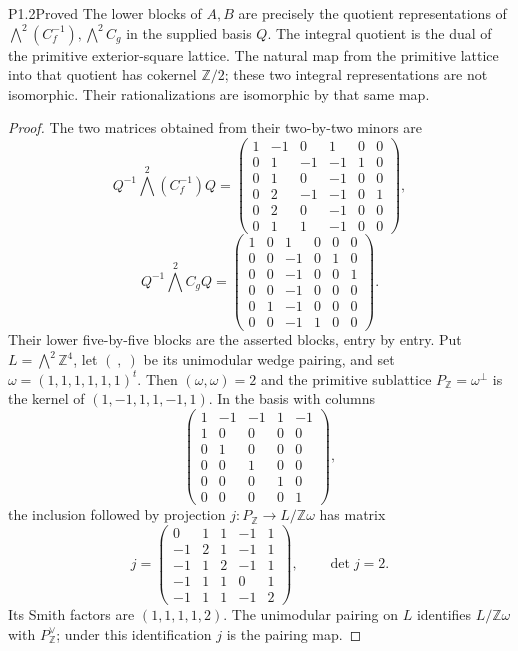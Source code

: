 \begin{statement}{P1.2}{Proved}
The lower blocks of $A,B$ are precisely the quotient representations of
$\bigwedge^2(C_f^{-1}),\bigwedge^2C_g$ in the supplied basis $Q$.
The integral quotient is the dual of the primitive exterior-square
lattice.  The natural map from the primitive lattice into that quotient
has cokernel $\mathbb Z/2$; these two integral representations are not
isomorphic.  Their rationalizations are isomorphic by that same map.
\end{statement}
\begin{proof}
The two matrices obtained from their two-by-two minors are
\[
Q^{-1}\bigwedge^2(C_f^{-1})Q=
\begin{pmatrix}
1&-1&0&1&0&0\\0&1&-1&-1&1&0\\0&1&0&-1&0&0\\
0&2&-1&-1&0&1\\0&2&0&-1&0&0\\0&1&1&-1&0&0
\end{pmatrix},
\]
\[
Q^{-1}\bigwedge^2C_gQ=
\begin{pmatrix}
1&0&1&0&0&0\\0&0&-1&0&1&0\\0&0&-1&0&0&1\\
0&0&-1&0&0&0\\0&1&-1&0&0&0\\0&0&-1&1&0&0
\end{pmatrix}.
\]
Their lower five-by-five blocks are the asserted blocks, entry by entry.
Put $L=\bigwedge^2\mathbb Z^4$, let $(\ ,\ )$ be its unimodular wedge
pairing, and set $\omega=(1,1,1,1,1,1)^t$.
Then $(\omega,\omega)=2$ and the primitive sublattice
$P_{\mathbb Z}=\omega^\perp$ is the kernel of
$(1,-1,1,1,-1,1)$.  In the basis with columns
\[
\begin{pmatrix}
1&-1&-1&1&-1\\1&0&0&0&0\\0&1&0&0&0\\
0&0&1&0&0\\0&0&0&1&0\\0&0&0&0&1
\end{pmatrix},
\]
the inclusion followed by projection
$j:P_{\mathbb Z}\longrightarrow L/\mathbb Z\omega$ has matrix
\[
j=\begin{pmatrix}
0&1&1&-1&1\\-1&2&1&-1&1\\-1&1&2&-1&1\\
-1&1&1&0&1\\-1&1&1&-1&2
\end{pmatrix},\qquad \det j=2.
\]
Its Smith factors are $(1,1,1,1,2)$.  The unimodular pairing on $L$
identifies $L/\mathbb Z\omega$ with $P_{\mathbb Z}^\vee$;
under this identification $j$ is the pairing map.


\end{proof}
